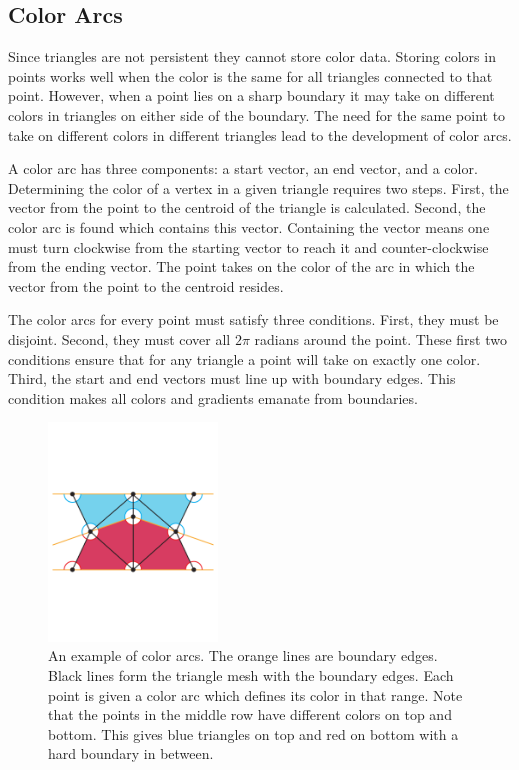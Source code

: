 \documentclass[review]{acmsiggraph}
\begin{document}
\subsection{Color Arcs}
Since triangles are not persistent they cannot store color data.
Storing colors in points works well when the color is the same for all triangles connected
to that point. However, when a point lies on a sharp boundary it may take on different colors in
triangles on either side of the boundary. The need for the same point to take on different
colors in different triangles lead to the development of color arcs.

A color arc has three components: a start vector, an end vector, and a color. 
Determining the color of a vertex in a given triangle requires two steps. First,
the vector from the point to the centroid of the triangle is calculated. Second,
the color arc is found which contains this vector. Containing the vector means one must turn
clockwise from the starting vector to reach it and counter-clockwise from the ending vector.
The point takes on the color of the arc in which the vector from the point to the centroid resides.

The color arcs for every point must satisfy three conditions. First, they must be disjoint. Second,
they must cover all $2\pi$ radians around the point. These first two conditions ensure that for any
triangle a point will take on exactly one color. Third, the start and end vectors must line up
with boundary edges. This condition makes all colors and gradients emanate from boundaries.

\begin{figure}
    \centering
        \includegraphics[width=0.4\textwidth]{images/colorarcs}
    \caption{An example of color arcs. The orange lines are boundary edges. Black lines form the triangle
    mesh with the boundary edges. Each point is given a color arc which defines its color in that range.
    Note that the points in the middle row have different colors on top and bottom. This gives blue
    triangles on top and red on bottom with a hard boundary in between.}
\end{figure}
\end{document}
